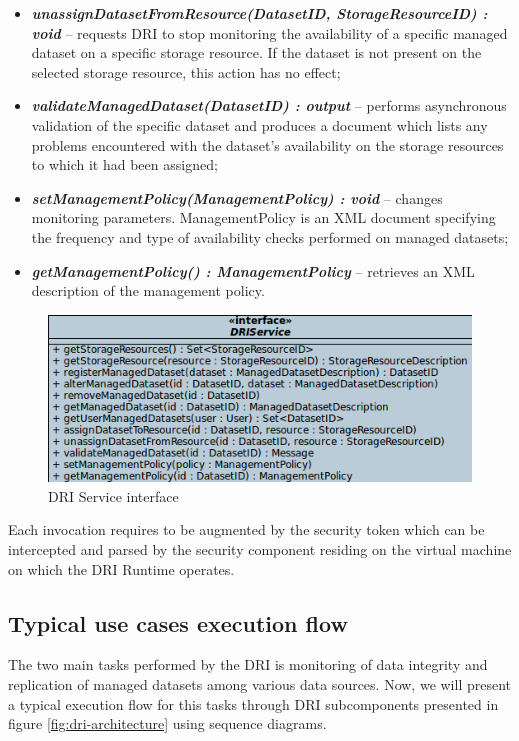 \begin{itemize}
	\item \textbf{\textit{unassignDatasetFromResource(DatasetID, 
	StorageResourceID) : void}} -- requests DRI to stop monitoring the 
	availability of a specific managed dataset on a specific storage resource.
	If the dataset is not present on the selected storage resource, this action
	has no effect;
	
	\item \textbf{\textit{validateManagedDataset(DatasetID) : output}} --
	performs asynchronous validation of the specific dataset and produces a
	document which lists any problems encountered with the dataset's
	availability on the storage resources to which it had been assigned;
	
	\item \textbf{\textit{setManagementPolicy(ManagementPolicy) : void}} --
	changes monitoring parameters. ManagementPolicy is an XML document
	specifying the frequency and type of availability checks performed on
	managed datasets;
	
	\item \textbf{\textit{getManagementPolicy() : ManagementPolicy}} --
	retrieves an XML description of the management policy.
\end{itemize}

\begin{figure}[h!]
	\centering
	\includegraphics[width=\textwidth]{images/dri-interface.png}
	\caption{DRI Service interface}
	\label{fig:dri-interface}
\end{figure}

Each invocation requires to be augmented by the security token which can be
intercepted and parsed by the security component residing on the virtual
machine on which the DRI Runtime operates.

		\subsection{Typical use cases execution flow}
The two main tasks performed by the DRI is monitoring of data integrity and
replication of managed datasets among various data sources. Now, we will
present a typical execution flow for this tasks through DRI subcomponents
presented in figure \ref{fig:dri-architecture} using sequence diagrams.\\

